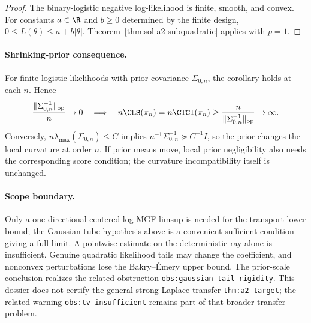 \documentclass[../main.tex]{subfiles}
\begin{document}
\begin{proof}
The binary-logistic negative log-likelihood is finite, smooth, and convex.  For constants
$a\in\R$ and $b\ge0$ determined by the finite design,
$0\le L(\theta)\le a+b|\theta|$.  Theorem~\ref{thm:sol-a2-subquadratic} applies with $p=1$.
\end{proof}

\paragraph{Shrinking-prior consequence.}
For finite logistic likelihoods with prior covariance $\Sigma_{0,n}$, the corollary holds at each
$n$.  Hence
\[
 \frac{\|\Sigma_{0,n}^{-1}\|_{\mathrm{op}}}{n}\to0
 \quad\Longrightarrow\quad
 n\CLS(\pi_n)=n\CTCI(\pi_n)
 \ge\frac{n}{\|\Sigma_{0,n}^{-1}\|_{\mathrm{op}}}\to\infty.
\]
Conversely, $n\lambda_{\max}(\Sigma_{0,n})\le C$ implies
$n^{-1}\Sigma_{0,n}^{-1}\succeq C^{-1}I$, so the prior changes the local curvature at order
$n$.  If prior means move, local prior negligibility also needs the corresponding score condition;
the curvature incompatibility itself is unchanged.

\paragraph{Scope boundary.}
Only a one-directional centered log-MGF limsup is needed for the transport lower bound; the
Gaussian-tube hypothesis above is a convenient sufficient condition giving a full limit.  A
pointwise estimate on the deterministic ray alone is insufficient.  Genuine quadratic likelihood
tails may change the coefficient, and nonconvex perturbations lose the Bakry--\'Emery upper bound.
The prior-scale conclusion realizes the related obstruction
\texttt{obs:gaussian-tail-rigidity}.  This dossier does not certify the general strong-Laplace
transfer \texttt{thm:a2-target}; the related warning \texttt{obs:tv-insufficient} remains part of
that broader transfer problem.
\end{document}
